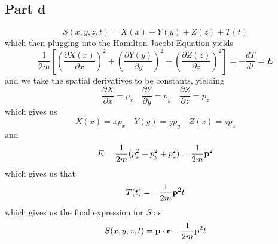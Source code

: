 \documentclass[12pt]{report}
\begin{document}
\subsection*{Part d}
\begin{equation*}
    S(x,y,z,t) = X(x) + Y(y) + Z(z) + T(t)
\end{equation*}
which then plugging into the Hamilton-Jacobi Equation yields
\begin{equation*}
    \frac{1}{2m}\left[\left(\frac{\partial X(x)}{\partial x}\right)^2 + \left(\frac{\partial Y(y)}{\partial y}\right)^2 + \left(\frac{\partial Z(z)}{\partial z}\right)^2\right] = - \frac{dT}{dt} = E 
\end{equation*}
and we take the spatial derivatives to be constants, yielding
\begin{equation*}
    \frac{\partial X}{\partial x} = p_x \quad \frac{\partial Y}{\partial y} = p_y \quad \frac{\partial Z}{\partial z} = p_z 
\end{equation*}
which gives us
\begin{equation*}
    X(x) = xp_x \quad Y(y) = yp_y \quad Z(z) = zp_z
\end{equation*}
and
\begin{equation*}
    E = \frac{1}{2m}(p_x^2 + p_y^2 + p_z^2) = \frac{1}{2m}\bold{p}^2
\end{equation*}
which gives us that
\begin{equation*}
    T(t) = -\frac{1}{2m}\bold{p}^2 t
\end{equation*}
which gives us the final expression for $S$ as
\begin{equation*}
    S(x,y,z,t) = \bold{p} \cdot \bold{r} - \frac{1}{2m} \bold{p}^2 t
\end{equation*}
\end{document}
